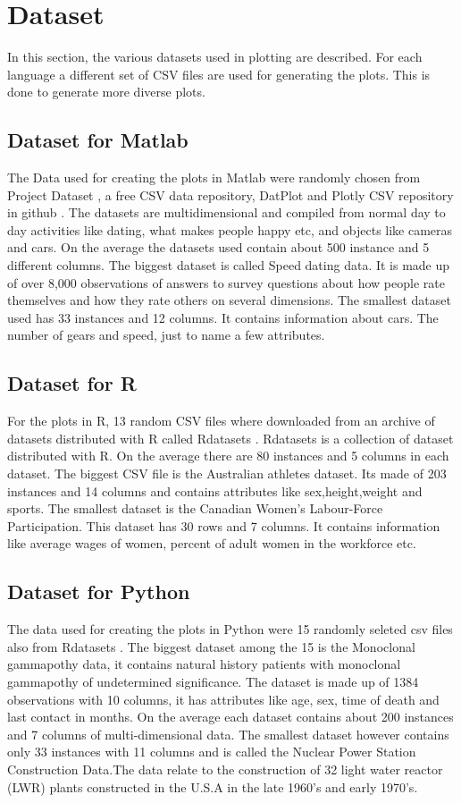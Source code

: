 \documentclass[12pt, a4paper,oneside]{report}
\begin{document}
\section{Dataset}
In this section, the various datasets used in plotting are described. For each language a different set of CSV files are used for generating the plots. This is done to generate more diverse plots.

\subsection{Dataset for Matlab}
The Data used for creating the plots in Matlab were randomly chosen from Project Dataset \cite{projectdataset}, a free CSV data repository, DatPlot \cite{datplot} and Plotly CSV repository in github \cite{plotly}. The datasets are multidimensional and compiled from normal day to day activities like dating, what makes people happy etc, and objects like cameras and cars. On the average the datasets used contain about 500 instance and 5 different columns. The biggest dataset is called Speed dating data. It is made up of over 8,000 observations of answers to survey questions about how people rate themselves and how they rate others on several dimensions. The smallest dataset used has 33 instances and 12 columns. It contains information about cars. The number of gears and speed, just to name a few attributes.

\subsection{Dataset for R}
For the plots in R, 13 random CSV files where downloaded from an archive of datasets distributed with R called Rdatasets  \cite{rdata}. Rdatasets is a collection of dataset distributed with R. On the average there are 80 instances and 5 columns in each dataset.
The biggest CSV file is the Australian athletes dataset. Its made of 203 instances and 14 columns and contains attributes like sex,height,weight and sports. The smallest dataset is the Canadian Women's Labour-Force Participation. This dataset has 30 rows and 7 columns. It contains information like average wages of women, percent of adult women in the workforce etc.


\subsection{Dataset for Python}
The data used for creating the plots in Python were 15 randomly seleted csv files also from  Rdatasets \cite{rdata}. The biggest dataset among the 15 is the Monoclonal gammapothy data, it contains natural history patients with monoclonal gammapothy of undetermined significance. The dataset is made up of 1384 observations with 10 columns, it has attributes like age, sex, time of death and last contact in months. On the average each dataset contains about 200 instances and 7 columns of multi-dimensional data. The smallest dataset however contains only 33 instances with 11 columns and is called the Nuclear Power Station Construction Data.The data relate to the construction of 32 light water reactor (LWR) plants constructed in the U.S.A in the late 1960's and early 1970's.
\end{document}
